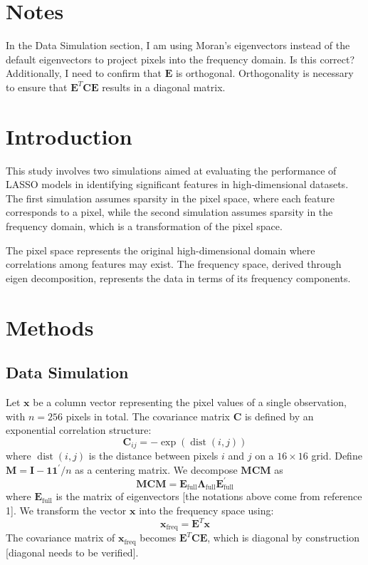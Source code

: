 \documentclass[12pt]{article}
\title{}
\author{Siyang Ren}
\begin{document}
\maketitle

\section*{Notes}

In the Data Simulation section, I am using Moran's eigenvectors instead of the default eigenvectors to project pixels into the frequency domain. Is this correct? Additionally, I need to confirm that \( \mathbf{E} \) is orthogonal. Orthogonality is necessary to ensure that \( \mathbf{E}^T \mathbf{C} \mathbf{E} \) results in a diagonal matrix.


\section*{Introduction}

This study involves two simulations aimed at evaluating the performance of LASSO models in identifying significant features in high-dimensional datasets. The first simulation assumes sparsity in the pixel space, where each feature corresponds to a pixel, while the second simulation assumes sparsity in the frequency domain, which is a transformation of the pixel space.

The pixel space represents the original high-dimensional domain where correlations among features may exist. The frequency space, derived through eigen decomposition, represents the data in terms of its frequency components.


\section*{Methods}

\subsection*{Data Simulation}

Let \( \mathbf{x} \) be a column vector representing the pixel values of a single observation, with \( n = 256 \) pixels in total. The covariance matrix \( \mathbf{C} \) is defined by an exponential correlation structure: 
\[
\mathbf{C}_{ij} = -\exp(\operatorname{dist}(i,j))
\]
where \( \operatorname{dist}(i,j) \) is the distance between pixels \( i \) and \( j \) on a \( 16 \times 16 \) grid. Define \( \mathbf{M} = \mathbf{I} - \mathbf{1} \mathbf{1}^{\prime} / n \) as a centering matrix. We decompose \( \mathbf{MCM} \) as
\[
\mathbf{MCM} = \mathbf{E}_{\text{full}} \mathbf{\Lambda}_{\text{full}} \mathbf{E}_{\text{full}}^{\prime}
\]
where \( \mathbf{E}_{\text{full}} \) is the matrix of eigenvectors [the notations above come from reference 1]. We transform the vector \( \mathbf{x} \) into the frequency space using:
\[
\mathbf{x}_{\text{freq}} = \mathbf{E}^T \mathbf{x}
\]
The covariance matrix of \( \mathbf{x}_{\text{freq}} \) becomes \( \mathbf{E}^T \mathbf{C} \mathbf{E} \), which is diagonal by construction [diagonal needs to be verified].
\end{document}
